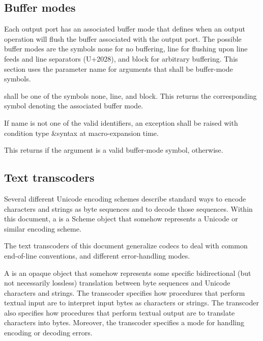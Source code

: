 \subsection{Buffer modes}

Each output port has an associated buffer mode that defines when an
output operation will flush the buffer associated with the output
port. The possible buffer modes are the symbols {\cf none} for no buffering,
{\cf line} for flushing upon line feeds and line separators (U+2028), and
{\cf block} for arbitrary buffering.  This section uses the parameter name
 for arguments that shall be buffer-mode symbols.

\begin{entry}{%
}
   
 shall be one of the symbols {\cf none}, {\cf line}, and
{\cf block}. This returns the corresponding symbol denoting the
associated buffer mode.

If name is not one of the valid identifiers, an exception shall be
raised with condition type {\cf\&syntax} at macro-expansion time.
\end{entry}

\begin{entry}{%
}
   
This returns \schtrue{} if the argument is a valid buffer-mode symbol,
\schfalse{} otherwise.
\end{entry}

\subsection{Text transcoders}

Several different Unicode encoding schemes describe standard ways to
encode characters and strings as byte sequences and to decode those
sequences.  Within this document, a  is a Scheme object
that somehow represents a Unicode or similar encoding scheme.

The text transcoders of this document generalize codecs
to deal with common end-of-line conventions, and different
error-handling modes.

A  is an opaque object that somehow represents
some specific bidirectional (but not necessarily lossless) translation
between byte sequences and Unicode characters and strings.  The
transcoder specifies how procedures that perform textual input are to
interpret input bytes as characters or strings.  The transcoder also
specifies how procedures that perform textual output are to translate
characters into bytes.  Moreover, the transcoder specifies a
mode for handling encoding or decoding errors.

